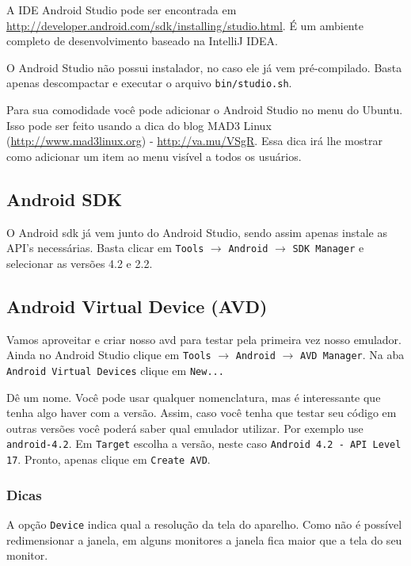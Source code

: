 A IDE Android Studio pode ser encontrada em
\url{http://developer.android.com/sdk/installing/studio.html}. É um
ambiente completo de desenvolvimento baseado na IntelliJ IDEA.

O Android Studio não possui instalador, no caso ele já vem
pré-compilado. Basta apenas descompactar e executar o arquivo
\texttt{bin/studio.sh}.

Para sua comodidade você pode adicionar o Android Studio no menu do
Ubuntu. Isso pode ser feito usando a dica do blog MAD3 Linux
(\url{http://www.mad3linux.org}) - \url{http://va.mu/VSgR}. Essa dica
irá lhe mostrar como adicionar um item ao menu visível a todos os
usuários.

\subsection{Android SDK \label{ssec:sdk}}

O Android \gls{sdk} já vem junto do Android Studio, sendo assim apenas
instale as API's necessárias. Basta clicar em \texttt{Tools}
$\rightarrow$ \texttt{Android} $\rightarrow$ \texttt{SDK Manager} e
selecionar as versões 4.2 e 2.2.

\subsection{Android Virtual Device (AVD)}

Vamos aproveitar e criar nosso \gls{avd} para testar pela primeira vez
nosso emulador. Ainda no Android Studio clique em \texttt{Tools}
$\rightarrow$ \texttt{Android} $\rightarrow$ \texttt{AVD Manager}. Na
aba \texttt{Android Virtual Devices} clique em \texttt{New...}

Dê um nome. Você pode usar qualquer nomenclatura, mas é interessante que
tenha algo haver com a versão. Assim, caso você tenha que testar seu
código em outras versões você poderá saber qual emulador utilizar. Por
exemplo use \texttt{android-4.2}. Em \texttt{Target} escolha a versão,
neste caso \texttt{Android 4.2 - API Level 17}. Pronto, apenas clique em
\texttt{Create AVD}.

\subsubsection{Dicas}

A opção \texttt{Device} indica qual a resolução da tela do aparelho.
Como não é possível redimensionar a janela, em alguns monitores a janela
fica maior que a tela do seu monitor.


